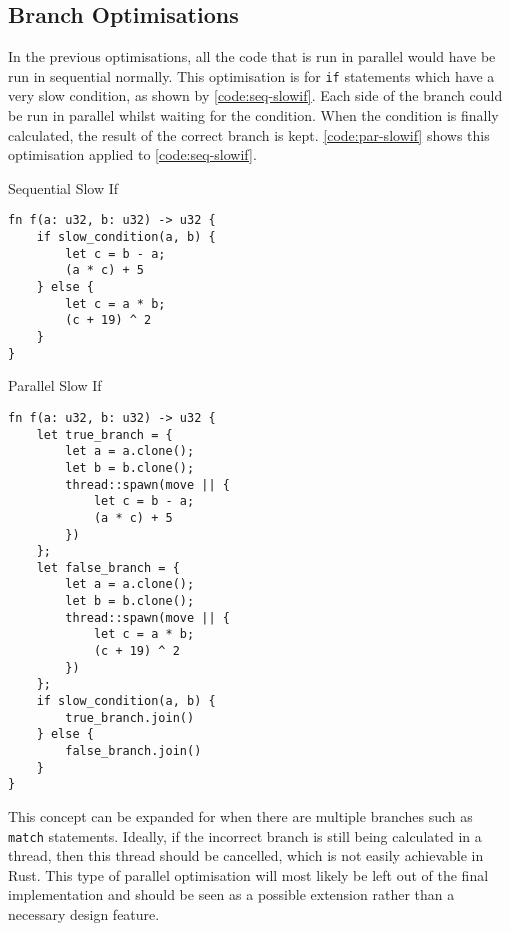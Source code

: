 \documentclass[conference]{IEEEtran}
\begin{document}
\subsection{Branch Optimisations}
In the previous optimisations, all the code that is run in parallel would have be run in sequential normally. This optimisation is for \texttt{if} statements which have a very slow condition, as shown by \autoref{code:seq-slowif}. Each side of the branch could be run in parallel whilst waiting for the condition. When the condition is finally calculated, the result of the correct branch is kept. \autoref{code:par-slowif} shows this optimisation applied to \autoref{code:seq-slowif}.

\begin{algorithm}
\caption{Sequential Slow If}
\label{code:seq-slowif}
\begin{verbatim}
fn f(a: u32, b: u32) -> u32 {
    if slow_condition(a, b) {
        let c = b - a;
        (a * c) + 5
    } else {
        let c = a * b;
        (c + 19) ^ 2
    }
}
\end{verbatim}
\end{algorithm}

\begin{algorithm}
\caption{Parallel Slow If}
\label{code:par-slowif}
\begin{verbatim}
fn f(a: u32, b: u32) -> u32 {
    let true_branch = {
        let a = a.clone();
        let b = b.clone();
        thread::spawn(move || {
            let c = b - a;
            (a * c) + 5
        })
    };
    let false_branch = {
        let a = a.clone();
        let b = b.clone();
        thread::spawn(move || {
            let c = a * b;
            (c + 19) ^ 2
        })
    };
    if slow_condition(a, b) {
        true_branch.join()
    } else {
        false_branch.join()
    }
}

\end{verbatim}
\end{algorithm}

This concept can be expanded for when there are multiple branches such as \texttt{match} statements. Ideally, if the incorrect branch is still being calculated in a thread, then this thread should be cancelled, which is not easily achievable in Rust. This type of parallel optimisation will most likely be left out of the final implementation and should be seen as a possible extension rather than a necessary design feature.
\end{document}
